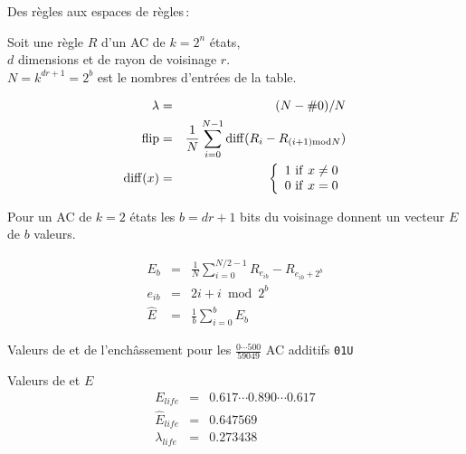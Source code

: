 \documentclass[a4paper,dvips]{slides}
\newenvironment{mynote}{\begin{note}\begin{scriptsize}}{\end{scriptsize}\end{note}}
\newcommand{\mytitle}[1]{\begin{center}\begin{large}#1\end{large}\end{center}}
\newcommand{\mystitle}[1]{\begin{center}#1\end{center}}
\begin{document}

\begin{slide}
  \mytitle{Des r\`egles aux espaces de r\`egles\,:}
  \begin{footnotesize}
    Soit une r\`egle $R$ d'un AC de $k = 2^n$ \'etats,\\
    $d$ dimensions et de rayon de voisinage $r$.\\
    $N = k^{dr+1} = 2^b$ est le nombres d'entr\'ees de la table.
  \end{footnotesize}
  \begin{eqnarray}
    \footnotesize
    \lambda & = & (N-\#0)/N \nonumber \\
    \small
    {\rm flip} & = & \frac{1}{N}\sum_{i=0}^{N-1}{\rm
      diff}(R_{i}-R_{(i+1){\rm mod}N}) \nonumber \\
    {\rm diff}(x) & = & \left\lbrace
    \begin{array}{l}
      1\ {\rm if}\ x \ne 0\\ 0\ {\rm if}\ x = 0
    \end{array} \right. \nonumber
  \end{eqnarray}
  \begin{footnotesize}
    Pour un AC de $k = 2$ \'etats les $b = dr+1$ bits du voisinage donnent
    un vecteur $E$ de $b$ valeurs.
  \end{footnotesize}
  \begin{eqnarray}
    E_{b}& = &\frac{1}{N} \sum_{i = 0}^{N/2 - 1} R_{e_{ib}} -
    R_{e_{ib} + 2^b} \nonumber \\
    e_{ib}& = &2i + i \bmod 2^b \nonumber \\
    \hat{E}& = &\frac{1}{b} \sum_{i = 0}^{b} E_b \nonumber
  \end{eqnarray}
\end{slide}

\begin{slide}
  \mystitle{Valeurs de \alambda et de l'ench\^assement pour les
    $\frac{0\cdots 500}{59049}$ AC additifs \texttt{01U}}
  {Valeurs de \protect\alambda et $E$}
  \begin{eqnarray}
    E_{life} & = & {0.617\cdots 0.890\cdots 0.617} \nonumber \\
    \hat{E}_{life} & = & 0.647569 \nonumber \\
    \lambda_{life} & = & 0.273438 \nonumber
  \end{eqnarray}
\end{slide}
\end{document}

